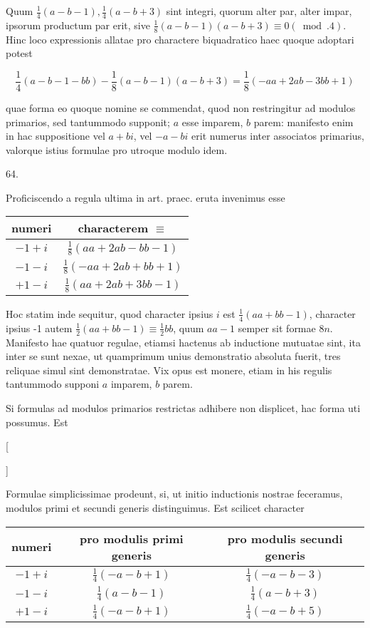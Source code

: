 \documentclass[10pt]{article}
\begin{document}
Quum \(\frac{1}{4}(a-b-1), \frac{1}{4}(a-b+3)\) sint integri, quorum alter par, alter impar, ipsorum productum par erit, sive \(\frac{1}{8}(a-b-1)(a-b+3) \equiv 0(\bmod .4)\). Hinc loco expressionis allatae pro charactere biquadratico haec quoque adoptari potest

\[
\frac{1}{4}(a-b-1-b b)-\frac{1}{8}(a-b-1)(a-b+3)=\frac{1}{8}(-a a+2 a b-3 b b+1)
\]

quae forma eo quoque nomine se commendat, quod non restringitur ad modulos primarios, sed tantummodo supponit; \(a\) esse imparem, \(b\) parem: manifesto enim in hac suppositione vel \(a+b i\), vel \(-a-b i\) erit numerus inter associatos primarius, valorque istius formulae pro utroque modulo idem.

64.

Proficiscendo a regula ultima in art. praec. eruta invenimus esse

\begin{center}
\begin{tabular}{c|c}
numeri & characterem \(\equiv\) \\
\hline
\(-1+i\) & \(\frac{1}{8}(a a+2 a b-b b-1)\) \\
\(-1-i\) & \(\frac{1}{8}(-a a+2 a b+b b+1)\) \\
\(+1-i\) & \(\frac{1}{8}(a a+2 a b+3 b b-1)\) \\
\end{tabular}
\end{center}

Hoc statim inde sequitur, quod character ipsius \(i\) est \(\frac{1}{4}(a a+b b-1)\), character ipsius -1 autem \(\frac{1}{2}(a a+b b-1) \equiv \frac{1}{2} b b\), quum \(a a-1\) semper sit formae \(8 n\). Manifesto hae quatuor regulae, etiamsi hactenus ab inductione mutuatae sint, ita inter se sunt nexae, ut quamprimum unius demonstratio absoluta fuerit, tres reliquae simul sint demonstratae. Vix opus est monere, etiam in his regulis tantummodo supponi \(a\) imparem, \(b\) parem.

Si formulas ad modulos primarios restrictas adhibere non displicet, hac forma uti possumus. Est

[

]

Formulae simplicissimae prodeunt, si, ut initio inductionis nostrae feceramus, modulos primi et secundi generis distinguimus. Est scilicet character

\begin{center}
\begin{tabular}{c|c|c}
numeri & pro modulis primi generis & pro modulis secundi generis \\
\hline
\(-1+i\) & \(\frac{1}{4}(-a-b+1)\) & \(\frac{1}{4}(-a-b-3)\) \\
\(-1-i\) & \(\frac{1}{4}(a-b-1)\) & \(\frac{1}{4}(a-b+3)\) \\
\(+1-i\) & \(\frac{1}{4}(-a-b+1)\) & \(\frac{1}{4}(-a-b+5)\) \\
\end{tabular}
\end{center}
\end{document}
